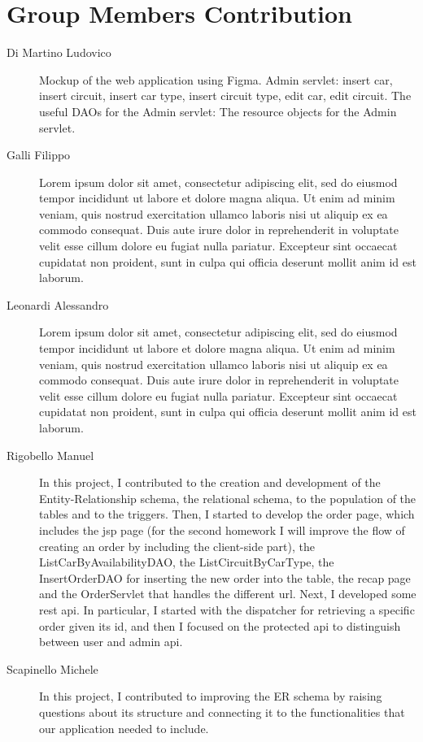 \section{Group Members Contribution}


\begin{description}
	\item[Di Martino Ludovico] Mockup of the web application using Figma. Admin servlet: insert car, insert circuit, insert car type, insert circuit type, edit car, edit circuit. The useful DAOs for the Admin servlet: The resource objects for the Admin servlet.
	\item[Galli Filippo] Lorem ipsum dolor sit amet, consectetur adipiscing elit, sed do eiusmod tempor incididunt ut labore et dolore magna aliqua. Ut enim ad minim veniam, quis nostrud exercitation ullamco laboris nisi ut aliquip ex ea commodo consequat. Duis aute irure dolor in reprehenderit in voluptate velit esse cillum dolore eu fugiat nulla pariatur. Excepteur sint occaecat cupidatat non proident, sunt in culpa qui officia deserunt mollit anim id est laborum.
	\item[Leonardi Alessandro] Lorem ipsum dolor sit amet, consectetur adipiscing elit, sed do eiusmod tempor incididunt ut labore et dolore magna aliqua. Ut enim ad minim veniam, quis nostrud exercitation ullamco laboris nisi ut aliquip ex ea commodo consequat. Duis aute irure dolor in reprehenderit in voluptate velit esse cillum dolore eu fugiat nulla pariatur. Excepteur sint occaecat cupidatat non proident, sunt in culpa qui officia deserunt mollit anim id est laborum.
	\item[Rigobello Manuel] In this project, I contributed to the creation and development of the Entity-Relationship schema, the relational schema, to the population of the tables and to the triggers. Then, I started to develop the order page, which includes the jsp page (for the second homework I will improve the flow of creating an order by including the client-side part), the ListCarByAvailabilityDAO, the ListCircuitByCarType, the InsertOrderDAO for inserting the new order into the table, the recap page and the OrderServlet that handles the different url. Next, I developed some rest api. In particular, I started with the dispatcher for retrieving a specific order given its id, and then I focused on the protected api to distinguish between user and admin api.
	\item[Scapinello Michele] In this project, I contributed to improving the ER schema by raising questions about its structure and connecting it to the functionalities that our application needed to include.

\end{description}
